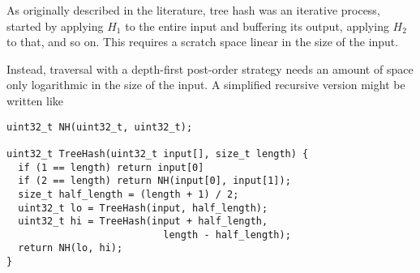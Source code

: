 \documentclass[acmsmall, nonacm]{acmart}
\begin{document}




As originally described in the literature, tree hash was an iterative process, started by applying $H_1$ to the entire input and buffering its output, applying $H_2$ to that, and so on.
This requires a scratch space linear in the size of the input.

Instead, traversal with a depth-first post-order strategy needs an amount of space only logarithmic in the size of the input.
A simplified recursive version might be written like

\begin{lstlisting}
uint32_t NH(uint32_t, uint32_t);

uint32_t TreeHash(uint32_t input[], size_t length) {
  if (1 == length) return input[0]
  if (2 == length) return NH(input[0], input[1]);
  size_t half_length = (length + 1) / 2;
  uint32_t lo = TreeHash(input, half_length);
  uint32_t hi = TreeHash(input + half_length,
                           length - half_length);
  return NH(lo, hi);
}
\end{lstlisting}
\end{document}

